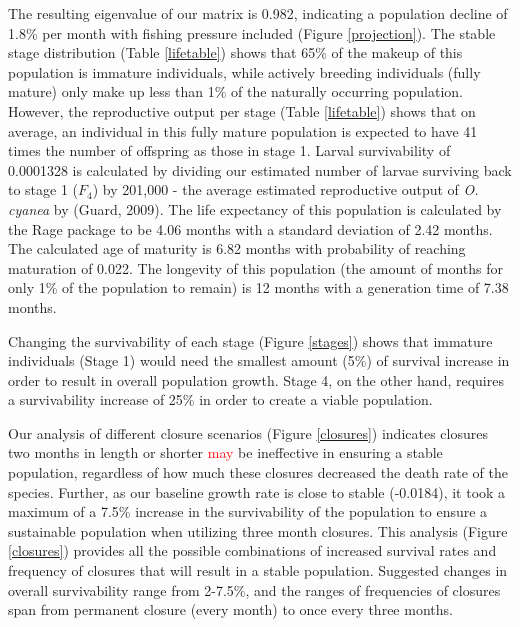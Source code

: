 \documentclass[
]{article}
\begin{document}
The resulting eigenvalue of our matrix is 0.982, indicating a population decline of 1.8\% per month with fishing pressure included (Figure \ref{projection}). The stable stage distribution (Table \ref{lifetable}) shows that 65\% of the makeup of this population is immature individuals, while actively breeding individuals (fully mature) only make up less than 1\% of the naturally occurring population. However, the reproductive output per stage (Table \ref{lifetable}) shows that on average, an individual in this fully mature population is expected to have 41 times the number of offspring as those in stage 1. Larval survivability of 0.0001328 is calculated by dividing our estimated number of larvae surviving back to stage 1 (\(F_4\)) by 201,000 - the average estimated reproductive output of \emph{O. cyanea} by (Guard, 2009). The life expectancy of this population is calculated by the Rage package to be 4.06 months with a standard deviation of 2.42 months. The calculated age of maturity is 6.82 months with probability of reaching maturation of 0.022. The longevity of this population (the amount of months for only 1\% of the population to remain) is 12 months with a generation time of 7.38 months.

Changing the survivability of each stage (Figure \ref{stages}) shows that immature individuals (Stage 1) would need the smallest amount (5\%) of survival increase in order to result in overall population growth. Stage 4, on the other hand, requires a survivability increase of 25\% in order to create a viable population.

Our analysis of different closure scenarios (Figure \ref{closures}) indicates closures two months in length or shorter \textcolor{red}{may} be ineffective in ensuring a stable population, regardless of how much these closures decreased the death rate of the species. Further, as our baseline growth rate is close to stable (-0.0184), it took a maximum of a 7.5\% increase in the survivability of the population to ensure a sustainable population when utilizing three month closures. This analysis (Figure \ref{closures}) provides all the possible combinations of increased survival rates and frequency of closures that will result in a stable population. Suggested changes in overall survivability range from 2-7.5\%, and the ranges of frequencies of closures span from permanent closure (every month) to once every three months.
\end{document}
